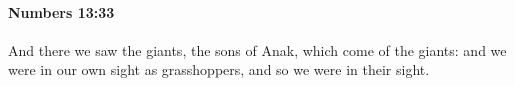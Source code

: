 
		\paragraph{Numbers 13:33} %
			\label{NUMBERS-13-33}

			And there we saw the giants, the sons of Anak, which come of the giants: and we were in our own sight as grasshoppers, and so we were in their sight.

